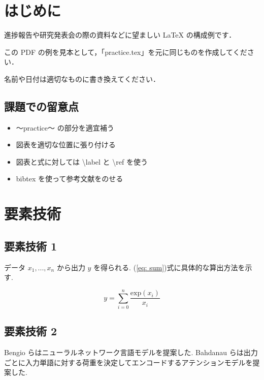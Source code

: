 \documentclass[twocolumn]{jarticle}     %
\begin{document}

\section{はじめに}
進捗報告や研究発表会の際の資料などに望ましい LaTeX の構成例です．\par
この PDF の例を見本として，「practice.tex」を元に同じものを作成してください．\par
名前や日付は適切なものに書き換えてください．

\subsection{課題での留意点}

\begin{itemize}
\item 〜practice〜 の部分を適宜補う
\item 図表を適切な位置に張り付ける
\item 図表と式に対しては \textbackslash label と \textbackslash ref を使う
\item bibtex を使って参考文献をのせる
\end{itemize}

\section{要素技術}

\subsection{要素技術 1}
データ $x_{1},...,x_{n}$ から出力 $y$ を得られる. (\ref{eq: sum})式に具体的な算出方法を示す.

\begin{equation}
  y = \sum^{n}_{i=0} \frac{\mathrm{exp}(x_{i})}{x_{i}}
  \label{eq: sum}
\end{equation}

\subsection{要素技術 2}
Bengio らはニューラルネットワーク言語モデルを提案した\cite{translate}.
 Bahdanau らは出力ごとに入力単語に対する荷重を決定してエンコードするアテンションモデルを提案した\cite{FFNN}.
\end{document}
